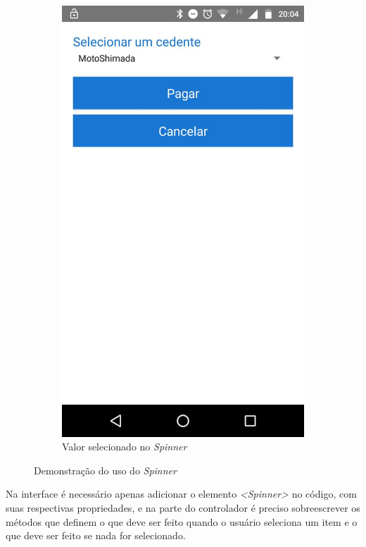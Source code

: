 \documentclass[hidelinks,12pt]{article}
\begin{document}
\begin{figure}[H]
\begin{subfigure}{0.5\textwidth}
		\includegraphics[scale=0.3]{spinner_selected}
		\caption{Valor selecionado no \textit{Spinner}}
		\label{spinner_sel}
	\end{subfigure}
	\caption{Demonstra\c{c}\~ao do uso do \textit{Spinner}}
	\label{spinner}
\end{figure}
Na interface \'e necess\'ario apenas adicionar o elemento \textit{\textless{Spinner}\textgreater} no c\'odigo, com suas respectivas propriedades, e na parte do controlador \'e preciso sobreescrever os m\'etodos que definem o que deve ser feito quando o usu\'ario seleciona um item e o que deve ser feito se nada for selecionado.
\end{document}

